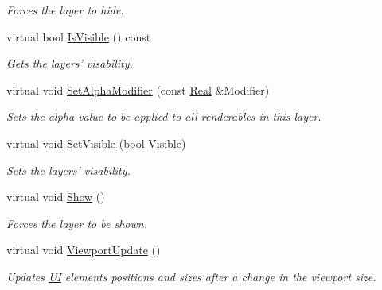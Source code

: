\begin{DoxyCompactItemize}
\begin{DoxyCompactList}\small\item\em Forces the layer to hide. \item\end{DoxyCompactList}\item 
virtual bool \hyperlink{classMezzanine_1_1UI_1_1Layer_a8a9222e729f47a4cfec32325a03cf7f3}{IsVisible} () const 
\begin{DoxyCompactList}\small\item\em Gets the layers' visability. \item\end{DoxyCompactList}\item 
virtual void \hyperlink{classMezzanine_1_1UI_1_1Layer_ac4d62751800ec888cd93f55bb9e160fb}{SetAlphaModifier} (const \hyperlink{namespaceMezzanine_a726731b1a7df72bf3583e4a97282c6f6}{Real} \&Modifier)
\begin{DoxyCompactList}\small\item\em Sets the alpha value to be applied to all renderables in this layer. \item\end{DoxyCompactList}\item 
virtual void \hyperlink{classMezzanine_1_1UI_1_1Layer_a00b524742cf51db97b17e7d8f6e995cf}{SetVisible} (bool Visible)
\begin{DoxyCompactList}\small\item\em Sets the layers' visability. \item\end{DoxyCompactList}\item 
\hypertarget{classMezzanine_1_1UI_1_1Layer_a02f08145c60a66b441cd37313cdfa9df}{
virtual void \hyperlink{classMezzanine_1_1UI_1_1Layer_a02f08145c60a66b441cd37313cdfa9df}{Show} ()}
\label{classMezzanine_1_1UI_1_1Layer_a02f08145c60a66b441cd37313cdfa9df}

\begin{DoxyCompactList}\small\item\em Forces the layer to be shown. \item\end{DoxyCompactList}\item 
virtual void \hyperlink{classMezzanine_1_1UI_1_1Layer_ae19b12ed20756cbf3bb666d7443e7b54}{ViewportUpdate} ()
\begin{DoxyCompactList}\small\item\em Updates \hyperlink{namespaceMezzanine_1_1UI}{UI} elements positions and sizes after a change in the viewport size. \item\end{DoxyCompactList}\end{DoxyCompactItemize}
